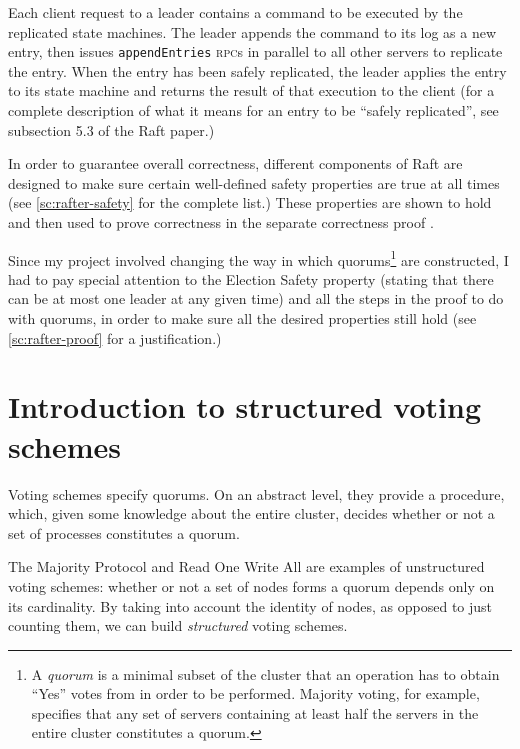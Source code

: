 \documentclass[11pt,chapterprefix=true,toc=bibliography,numbers=noendperiod,
               footnotes=multiple,twoside]{scrreprt}
\newcommand{\appendEntriesRPC}[0]{\texttt{appendEntries} \textsc{rpc}}
\begin{document}
Each client request to a leader contains a command to be executed by the replicated state machines. The leader appends the command to its log as a new entry, then issues \appendEntriesRPC s in parallel to all other servers to replicate the entry. When the entry has been safely replicated, the leader applies the entry to its state machine and returns the result of that execution to the client (for a complete description of what it means for an entry to be \enquote{safely replicated}, see subsection 5.3 of the Raft paper.)


In order to guarantee overall correctness, different components of Raft are designed to make sure certain well-defined safety properties are true at all times (see \cref{sc:rafter-safety} for the complete list.) These properties are shown to hold and then used to prove correctness in the separate correctness proof \autocite{raftproof}.

Since my project involved changing the way in which quorums\footnote{A \emph{quorum} is a minimal subset of the cluster that an operation has to obtain \enquote{Yes} votes from in order to be performed. Majority voting, for example, specifies that any set of servers containing at least half the servers in the entire cluster constitutes a quorum.} are constructed, I had to pay special attention to the Election Safety property (stating that there can be at most one leader at any given time) and all the steps in the proof to do with quorums, in order to make sure all the desired properties still hold (see \cref{sc:rafter-proof} for a justification.)

\section{Introduction to structured voting schemes\label{ssc:structured-voting-schemes}}

Voting schemes specify quorums. On an abstract level, they provide a procedure, which, given some knowledge about the entire cluster, decides whether or not a set of processes constitutes a quorum.

The Majority Protocol and Read One Write All are examples of unstructured voting schemes: whether or not a set of nodes forms a quorum depends only on its cardinality. By taking into account the identity of nodes, as opposed to just counting them, we can build \emph{structured} voting schemes.

\end{document}

